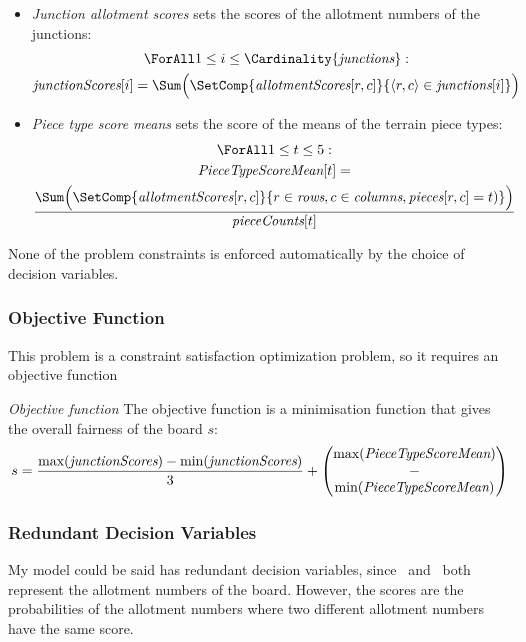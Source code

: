 \documentclass[a4paper,11pt]{article}
\begin{document}
\begin{itemize}
\item \emph{Junction allotment scores} sets the scores of the allotment numbers of the junctions:
  \begin{equation} \label{cons:hint}
    \begin{gathered}
      \ForAll 1 \leq i \leq \Cardinality{\Junctions} : \\
      \JunctionScores[i] = \Sum \Big( \SetComp{\AllotmentScores[r,c]}{\langle r, c \rangle \in \Junctions[i]} \Big)
    \end{gathered}
  \end{equation}

\item \emph{Piece type score means} sets the score of the means of the terrain piece types:
  \begin{equation}
    \begin{gathered}
      \ForAll 1 \leq t \leq 5 : \\
        \PieceTypeScoreMean[t] = \\ \frac{ \Sum \Big( \SetComp{\AllotmentScores[r,c]}{r \in \Rows, c \in \Cols, \Pieces[r,c] = t)} \Big) }{\PieceTypesCounts[t]}
    \end{gathered}
  \end{equation}
\end{itemize}
None of the problem constraints is enforced automatically by the
choice of decision variables.

\subsubsection{Objective Function}
This problem is a constraint satisfaction optimization problem, so it requires an objective function

\emph{Objective function} The objective function is a minimisation function that gives the overall fairness of the board $s$:
  \begin{equation} \label{cons:hint}
      s = \frac{\text{max}(\JunctionScores) - \text{min}(\JunctionScores)}{3} + \left(
      \begin{array}{@{}c@{}}
      \text{max}(\PieceTypeScoreMean) \\
      - \\
      \text{min}(\PieceTypeScoreMean) \\
      \end{array}
      \right)
  \end{equation}

\subsubsection{Redundant Decision Variables}
My model could be said has redundant decision variables, since \AllotmentNumbers~and \AllotmentScores~both represent the allotment numbers of the board. However, the scores are the probabilities of the allotment numbers where two different allotment numbers have the same score.
\end{document}
